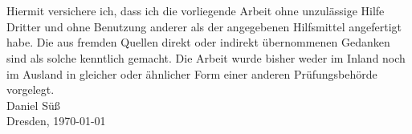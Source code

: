 \documentclass[a4paper,11pt,BCOR=8mm,twoside,headsepline]{scrbook}
\theoremstyle{remark}
\begin{document}
\newpage
{}
\thispagestyle{empty}
\section*{}\bigskip

Hiermit versichere ich, dass ich die vorliegende Arbeit ohne unzulässige Hilfe Dritter und ohne Benutzung anderer als der angegebenen Hilfsmittel angefertigt habe. Die aus fremden Quellen direkt oder indirekt übernommenen Gedanken sind als solche kenntlich gemacht. Die Arbeit wurde bisher weder im Inland noch im Ausland in gleicher oder ähnlicher Form einer anderen Prüfungsbehörde vorgelegt.\\[2.3cm]
Daniel Süß\\
Dresden, \today
\end{document}
